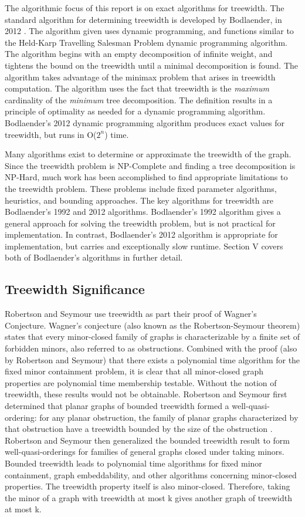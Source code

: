 \documentclass[12pt,conference]{IEEEtran}
\theoremstyle{plain}
\begin{document}
The algorithmic focus of this report is on exact algorithms for treewidth. The standard algorithm for determining treewidth is developed by Bodlaender, in 2012 \cite{bodlaender-2012}. The algorithm given uses dynamic programming, and functions similar to the Held-Karp Travelling Salesman Problem dynamic programming algorithm. The algorithm begins with an empty decomposition of infinite weight, and tightens the bound on the treewidth until a minimal decomposition is found. The algorithm takes advantage of the minimax problem that arises in treewidth computation. The algorithm uses the fact that treewidth is the \textit{maximum} cardinality of the \textit{minimum} tree decomposition. The definition results in a principle of optimality as needed for a dynamic programming algorithm. Bodlaender's 2012 dynamic programming algorithm produces exact values for treewidth, but runs in O($2^{n}$) time.

Many algorithms exist to determine or approximate the treewidth of the graph. Since the treewidth problem is NP-Complete and finding a tree decomposition is NP-Hard, much work has been accomplished to find appropriate limitations to the treewidth problem. These problems include fixed parameter algorithms, heuristics, and bounding approaches. The key algorithms for treewidth are Bodlaender's 1992 and 2012 algorithms. Bodlaender's 1992 algorithm gives a general approach for solving the treewidth problem, but is not practical for implementation. In contrast, Bodlaender's 2012 algorithm is appropriate for implementation, but carries and exceptionally slow runtime. Section V covers both of Bodlaender's algorithms in further detail.

\subsection{Treewidth Significance}

Robertson and Seymour use treewidth as part their proof of Wagner's Conjecture. Wagner's conjecture (also known as the Robertson-Seymour theorem) states that every minor-closed family of graphs is characterizable by a finite set of forbidden minors, also referred to as obstructions. Combined with the proof (also by Robertson and Seymour) that there exists a polynomial time algorithm for the fixed minor containment problem, it is clear that all minor-closed graph properties are polynomial time membership testable. Without the notion of treewidth, these results would not be obtainable. Robertson and Seymour first determined that planar graphs of bounded treewidth formed a well-quasi-ordering: for any planar obstruction, the family of planar graphs characterized by that obstruction have a treewidth bounded by the size of the obstruction \cite{seymour-stack-overflow}. Robertson and Seymour then generalized the bounded treewidth result to form well-quasi-orderings for families of general graphs closed under taking minors. Bounded treewidth leads to polynomial time algorithms for fixed minor containment, graph embeddability, and other algorithms concerning minor-closed properties. The treewidth property itself is also minor-closed. Therefore, taking the minor of a graph with treewidth at most k gives another graph of treewidth at most k. 
\end{document}
